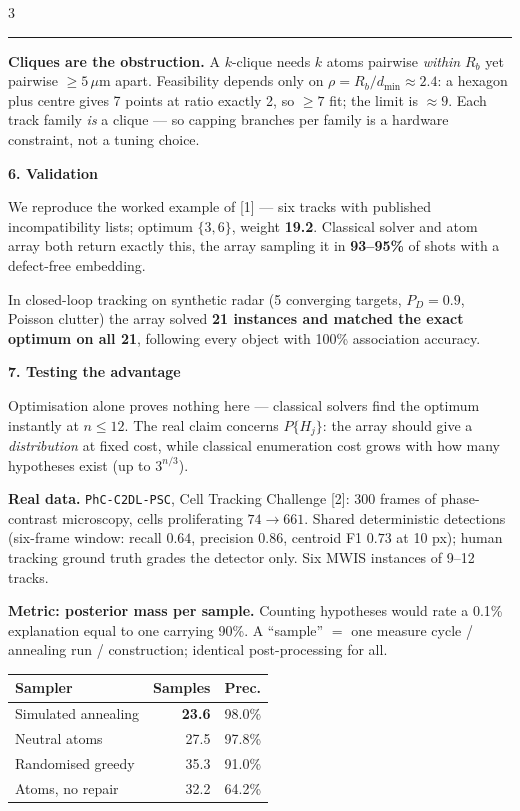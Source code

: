 \documentclass{article}
\newcommand{\sectfont}{\fontsize{28}{34}\selectfont}
\newcommand{\bodyfont}{\fontsize{19}{23}\selectfont}
\newcommand{\bigfont}{\fontsize{22}{27}\selectfont}
\newcommand{\headsec}[1]{%
  \par\vspace{3.5mm}%
  \colorbox{nbblue}{\begin{minipage}{\dimexpr\linewidth-2\fboxsep\relax}
    \vspace{1mm}\color{white}\sectfont\textbf{#1}\vspace{1mm}
  \end{minipage}}\par\vspace{3mm}}
\newcommand{\keybox}[2]{%
  \par\vspace{2mm}%
  {\color{#1}\rule{\linewidth}{1.2mm}}\par\vspace{-1mm}
  \colorbox{nblight}{\begin{minipage}{\dimexpr\linewidth-2\fboxsep\relax}
    \vspace{1mm}\bodyfont #2\vspace{1mm}
  \end{minipage}}\par\vspace{2mm}}
\begin{document}
\begin{multicols}{3}
\keybox{nbwarm}{\textbf{Cliques are the obstruction.} A $k$-clique needs $k$
atoms pairwise \emph{within} $R_b$ yet pairwise $\ge 5\,\mu$m apart. Feasibility
depends only on $\rho=R_b/d_{\min}\approx2.4$: a hexagon plus centre gives 7
points at ratio exactly 2, so $\ge7$ fit; the limit is $\approx9$. Each track
family \emph{is} a clique --- so capping branches per family is a hardware
constraint, not a tuning choice.}

\headsec{6. Validation}

We reproduce the worked example of [1] --- six tracks with published
incompatibility lists; optimum $\{3,6\}$, weight \textbf{19.2}. Classical solver
and atom array both return exactly this, the array sampling it in
\textbf{93--95\%} of shots with a defect-free embedding.

In closed-loop tracking on synthetic radar (5 converging targets, $P_D=0.9$,
Poisson clutter) the array solved \textbf{21 instances and matched the exact
optimum on all 21}, following every object with 100\% association accuracy.

\headsec{7. Testing the advantage}

Optimisation alone proves nothing here --- classical solvers find the optimum
instantly at $n\le12$. The real claim concerns $P\{H_j\}$: the array should give
a \emph{distribution} at fixed cost, while classical enumeration cost grows with
how many hypotheses exist (up to $3^{n/3}$).

\textbf{Real data.} \texttt{PhC-C2DL-PSC}, Cell Tracking Challenge [2]: 300
frames of phase-contrast microscopy, cells proliferating $74\rightarrow661$.
Shared deterministic detections (six-frame window: recall $0.64$, precision
$0.86$, centroid F1 $0.73$ at 10 px); human tracking ground truth grades the
detector only. Six MWIS instances of 9--12 tracks.

\textbf{Metric: posterior mass per sample.} Counting hypotheses would rate a
0.1\% explanation equal to one carrying 90\%. A ``sample'' $=$ one measure cycle
/ annealing run / construction; identical post-processing for all.

\vspace{2mm}
{\bigfont
\begin{tabular}{@{}l r r@{}}
\toprule
\textbf{Sampler} & \textbf{Samples} & \textbf{Prec.}\\
\midrule
Simulated annealing      & \textbf{23.6} & 98.0\%\\
\rowcolor{nblight} Neutral atoms      & 27.5 & 97.8\%\\
Randomised greedy        & 35.3 & 91.0\%\\
Atoms, no repair         & 32.2 & 64.2\%\\
\bottomrule
\end{tabular}}
\vspace{1mm}


\end{multicols}
\end{document}
